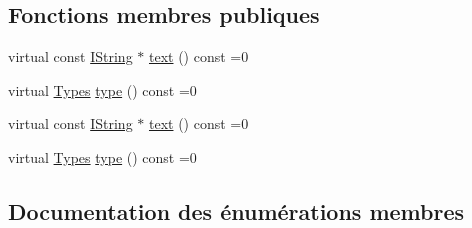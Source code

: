 \subsection*{Fonctions membres publiques}
\begin{DoxyCompactItemize}
\item 
virtual const \hyperlink{class_i_string}{I\+String} $\ast$ \hyperlink{class_i_doc_verbatim_add4915d64f94d8dae804dfedc4ac4e0b}{text} () const  =0
\item 
virtual \hyperlink{class_i_doc_verbatim_a580f5967906a7f65e90fadfc3f852c13}{Types} \hyperlink{class_i_doc_verbatim_a9ff8ea668122143828df49afef1696c9}{type} () const  =0
\item 
virtual const \hyperlink{class_i_string}{I\+String} $\ast$ \hyperlink{class_i_doc_verbatim_add4915d64f94d8dae804dfedc4ac4e0b}{text} () const  =0
\item 
virtual \hyperlink{class_i_doc_verbatim_a580f5967906a7f65e90fadfc3f852c13}{Types} \hyperlink{class_i_doc_verbatim_a9ff8ea668122143828df49afef1696c9}{type} () const  =0
\end{DoxyCompactItemize}


\subsection{Documentation des énumérations membres}
\hypertarget{class_i_doc_verbatim_a580f5967906a7f65e90fadfc3f852c13}{}
